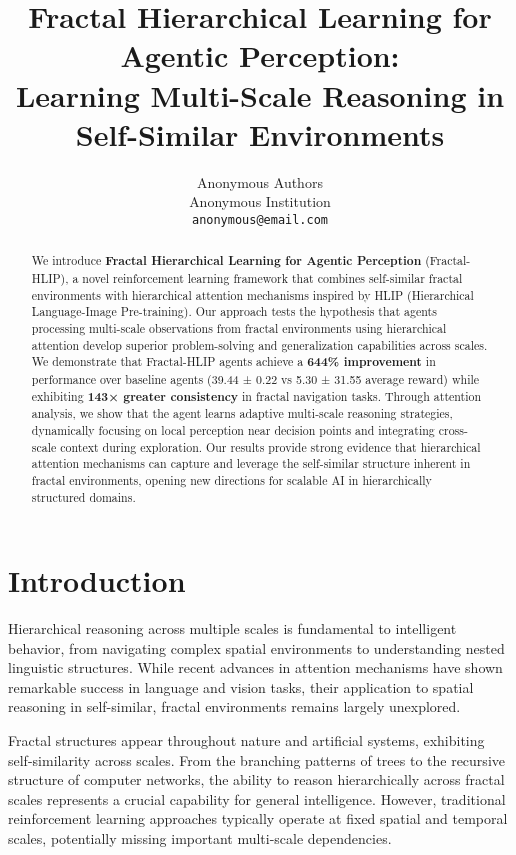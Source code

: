 \documentclass[11pt]{article}
\title{Fractal Hierarchical Learning for Agentic Perception: \\
Learning Multi-Scale Reasoning in Self-Similar Environments}
\author{
  Anonymous Authors\\
  Anonymous Institution\\
  \texttt{anonymous@email.com}
}
\begin{document}
\maketitle

\begin{abstract}
We introduce \textbf{Fractal Hierarchical Learning for Agentic Perception} (Fractal-HLIP), a novel reinforcement learning framework that combines self-similar fractal environments with hierarchical attention mechanisms inspired by HLIP (Hierarchical Language-Image Pre-training). Our approach tests the hypothesis that agents processing multi-scale observations from fractal environments using hierarchical attention develop superior problem-solving and generalization capabilities across scales. We demonstrate that Fractal-HLIP agents achieve a \textbf{644\% improvement} in performance over baseline agents (39.44 ± 0.22 vs 5.30 ± 31.55 average reward) while exhibiting \textbf{143× greater consistency} in fractal navigation tasks. Through attention analysis, we show that the agent learns adaptive multi-scale reasoning strategies, dynamically focusing on local perception near decision points and integrating cross-scale context during exploration. Our results provide strong evidence that hierarchical attention mechanisms can capture and leverage the self-similar structure inherent in fractal environments, opening new directions for scalable AI in hierarchically structured domains.
\end{abstract}

\section{Introduction}

Hierarchical reasoning across multiple scales is fundamental to intelligent behavior, from navigating complex spatial environments to understanding nested linguistic structures. While recent advances in attention mechanisms have shown remarkable success in language and vision tasks, their application to spatial reasoning in self-similar, fractal environments remains largely unexplored.

Fractal structures appear throughout nature and artificial systems, exhibiting self-similarity across scales. From the branching patterns of trees to the recursive structure of computer networks, the ability to reason hierarchically across fractal scales represents a crucial capability for general intelligence. However, traditional reinforcement learning approaches typically operate at fixed spatial and temporal scales, potentially missing important multi-scale dependencies.
\end{document}
